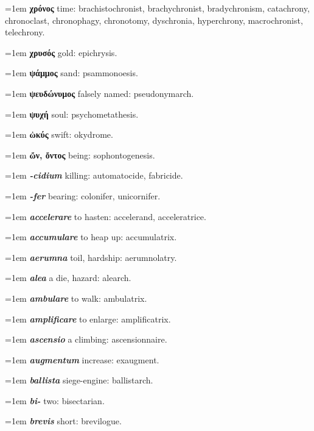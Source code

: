 \hangindent=1em \textbf{χρόνος} time: brachistochronist, brachychronist, bradychronism, catachrony, chronoclast, chronophagy, chronotomy, dyschronia, hyperchrony, macrochronist, telechrony.\par
\hangindent=1em \textbf{χρυσός} gold: epichrysis.\par
\hangindent=1em \textbf{ψάμμος} sand: psammonoesis.\par
\hangindent=1em \textbf{ψευδώνυμος} falsely named: pseudonymarch.\par
\hangindent=1em \textbf{ψυχή} soul: psychometathesis.\par
\hangindent=1em \textbf{ὠκύς} swift: okydrome.\par
\hangindent=1em \textbf{ὤν, ὄντος} being: sophontogenesis.\par
{}\par\smallskip
\hangindent=1em \textbf{\textit{-cidium}} killing: automatocide, fabricide.\par
\hangindent=1em \textbf{\textit{-fer}} bearing: colonifer, unicornifer.\par
\hangindent=1em \textbf{\textit{accelerare}} to hasten: accelerand, acceleratrice.\par
\hangindent=1em \textbf{\textit{accumulare}} to heap up: accumulatrix.\par
\hangindent=1em \textbf{\textit{aerumna}} toil, hardship: aerumnolatry.\par
\hangindent=1em \textbf{\textit{alea}} a die, hazard: alearch.\par
\hangindent=1em \textbf{\textit{ambulare}} to walk: ambulatrix.\par
\hangindent=1em \textbf{\textit{amplificare}} to enlarge: amplificatrix.\par
\hangindent=1em \textbf{\textit{ascensio}} a climbing: ascensionnaire.\par
\hangindent=1em \textbf{\textit{augmentum}} increase: exaugment.\par
\hangindent=1em \textbf{\textit{ballista}} siege-engine: ballistarch.\par
\hangindent=1em \textbf{\textit{bi-}} two: bisectarian.\par
\hangindent=1em \textbf{\textit{brevis}} short: brevilogue.\par
